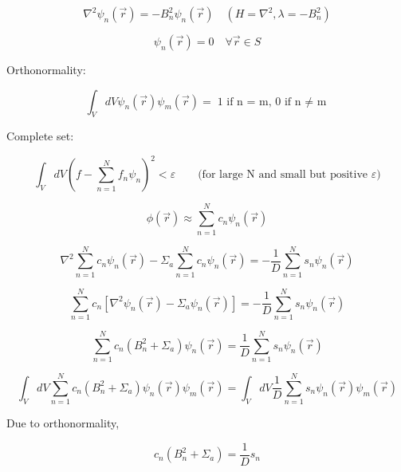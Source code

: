\documentclass[12pt]{article}
\newcommand{\rvec}{\ensuremath{\vec{r}}}
\begin{document}
\begin{equation*}
\nabla^2\psi_n(\rvec) = - B_n^2\psi_n(\rvec) \quad(H = \nabla^2, \lambda = -B_n^2)
\end{equation*}

\begin{equation*}
\psi_n(\rvec) = 0 \quad\forall \rvec \in S
\end{equation*}

Orthonormality:

\begin{equation*}
\int_V dV\psi_n(\rvec)\psi_m(\rvec) = \text{1 if n = m, 0 if n $\neq$ m}
\end{equation*}

Complete set:

\begin{equation*}
\int_V dV\left(f - \sum_{n=1}^N f_n\psi_n\right)^2 < \varepsilon \qquad 
\text{(for large N and small but positive $\varepsilon$)}
\end{equation*}

\begin{equation*}
\phi(\rvec) \approx \sum_{n=1}^N c_n\psi_n(\rvec)
\end{equation*}

\begin{equation*}
\nabla^2\sum_{n=1}^N c_n\psi_n(\rvec) - \Sigma_a\sum_{n=1}^N c_n\psi_n(\rvec) = 
-\frac{1}{D}\sum_{n=1}^N s_n\psi_n(\rvec)
\end{equation*}

\begin{equation*}
\sum_{n=1}^N c_n[\nabla^2\psi_n(\rvec) - \Sigma_a\psi_n(\rvec)]=-\frac{1}{D}\sum_{n=1}^N s_n\psi_n(\rvec)
\end{equation*}

\begin{equation*}
\sum_{n=1}^N c_n(B_n^2 + \Sigma_a)\psi_n(\rvec) = \frac{1}{D}\sum_{n=1}^N s_n\psi_n(\rvec)
\end{equation*}

\begin{equation*}
\int_V dV \sum_{n=1}^N c_n(B_n^2 + \Sigma_a)\psi_n(\rvec)\psi_m(\rvec) = 
\int_V dV \frac{1}{D}\sum_{n=1}^N s_n\psi_n(\rvec)\psi_m(\rvec)
\end{equation*}

Due to orthonormality,

\begin{equation*}
c_n(B_n^2 + \Sigma_a) = \frac{1}{D}s_n
\end{equation*}
\end{document}

